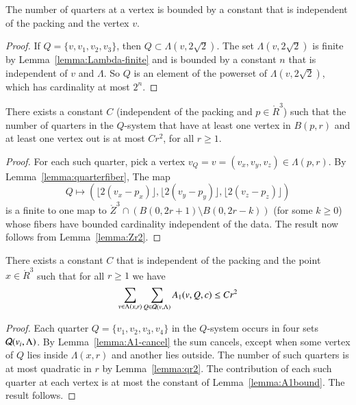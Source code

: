 \begin{lemma} \label{lemma:quarterfiber}
The number of quarters at a vertex is bounded by a constant that
is independent of the packing and the vertex $v$.
\end{lemma}

\begin{proof}  If $Q=\{v,v_1,v_2,v_3\}$, then $Q\subset
\Lambda(v,2\sqrt2)$.  The set $\Lambda(v,2\sqrt2)$ is finite by
Lemma~\ref{lemma:Lambda-finite} and is bounded by a constant $n$
that is independent of $v$ and $\Lambda$.  So $Q$ is an element of
the powerset of $\Lambda(v,2\sqrt2)$, which has cardinality at
most $2^n$.
\end{proof}

\begin{lemma}\label{lemma:qr2} There exists a constant $C$ (independent of the
packing and $p\in\ring{R}^3$) such that the number of
quarters in the $Q$-system that have at least one vertex in
$B(p,r)$ and at least one vertex out is at most $C r^2$, for all
$r\ge 1$.
\end{lemma}

\begin{proof}  For each such quarter, pick a vertex $v_Q=v=(v_x,v_y,v_z)\in
\Lambda(p,r)$.  By Lemma~\ref{lemma:quarterfiber}, The map
    $$
    Q\mapsto (\lfloor 2(v_x-p_x)\rfloor, \lfloor
    2(v_y-p_y)\rfloor,\lfloor 2(v_z-p_z)\rfloor)
    $$
is a finite to one map to $\ring{Z}^3 \cap ( B(0,2r+1) \setminus
B(0,2r-k))$ (for some $k\ge 0$) whose fibers have bounded
cardinality independent of the data.  The result now follows from
Lemma~\ref{lemma:Zr2}.
\end{proof}

\begin{lemma}\label{lemma:negA1} There exists a constant $C$ that is independent of
the packing and the point $x\in\ring{R}^3$ such that for
all $r\ge 1$ we have
$$\sum_{v\in\Lambda(x,r)} \sum_{Q\in{\mathcal Q}(v,\Lambda)}
      A_1 (v,Q,c) \le C r^2$$
\end{lemma}

\begin{proof}
Each quarter $Q=\{v_1,v_2,v_3,v_4\}$ in the $Q$-system occurs in
four sets ${\mathcal Q}(v_i,\Lambda)$.  By
Lemma~\ref{lemma:A1-cancel} the sum cancels, except when some
vertex of $Q$ lies inside $\Lambda(x,r)$ and another lies outside.
The number of such quarters is at most quadratic in $r$ by
Lemma~\ref{lemma:qr2}.  The contribution of each such quarter at
each vertex is at most the constant of Lemma~\ref{lemma:A1bound}.
The result follows.
\end{proof}

